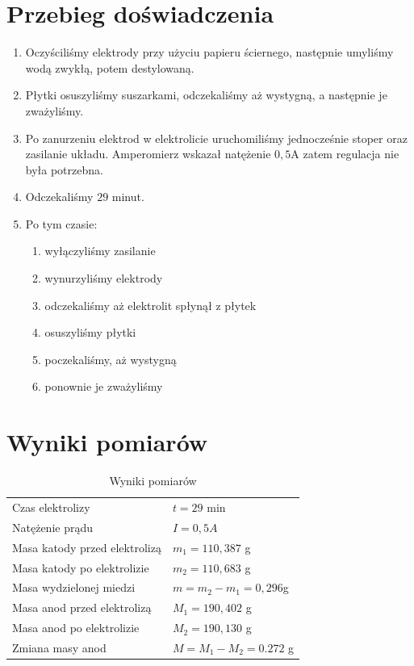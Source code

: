 \documentclass{fizykalab}
\begin{document}
\section{Przebieg doświadczenia}
\begin{enumerate}
    \item Oczyściliśmy elektrody przy użyciu papieru ściernego,
    następnie umyliśmy wodą zwykłą, potem destylowaną.
    \item Płytki osuszyliśmy suszarkami, odczekaliśmy aż
    wystygną, a następnie je zważyliśmy.
    \item Po zanurzeniu elektrod w elektrolicie
    uruchomiliśmy jednocześnie stoper
    oraz zasilanie układu. Amperomierz 
    wskazał natężenie $0,5$A zatem regulacja nie była
    potrzebna.
    \item Odczekaliśmy $29$ minut.
    \item Po tym czasie:
    \begin{enumerate}
        \item wyłączyliśmy zasilanie
        \item wynurzyliśmy elektrody
        \item odczekaliśmy aż elektrolit spłynął z płytek
        \item osuszyliśmy płytki
        \item poczekaliśmy, aż wystygną
        \item ponownie je zważyliśmy
    \end{enumerate}
\end{enumerate}


\section{Wyniki pomiarów}
\begin{table}[H]
    \centering
    \caption{Wyniki pomiarów}
    \begin{tabular}{ll}
        Czas elektrolizy & $t = 29$ min \\
        Natężenie prądu & $I = 0,5A$ \\ \hline
        Masa katody przed elektrolizą & $m_1= 110,387$ g \\
        Masa katody po elektrolizie & $m_2 = 110,683$ g  \\
        Masa wydzielonej miedzi & $m = m_2 - m_1 = 0,296$g \\ \hline
        Masa anod przed elektrolizą &  $M_1 = 190,402$ g \\
        Masa anod po elektrolizie & $M_2 = 190,130$ g \\
        Zmiana masy anod & $M = M_1 - M_2 = 0.272$ g \\
    \end{tabular}
\end{table}
\end{document}
